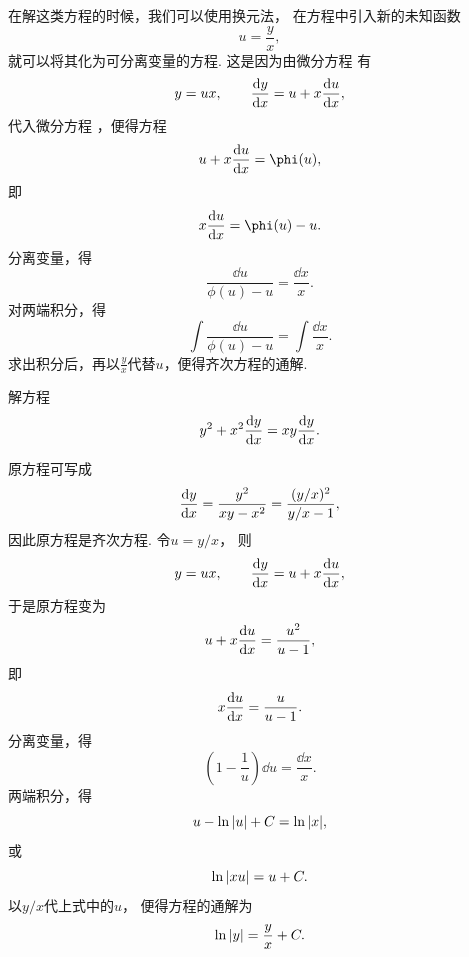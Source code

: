 在解这类方程的时候，我们可以使用换元法，
在方程中引入新的未知函数\begin{equation}\label{equation:微分方程.一阶齐次方程.中间步骤1}
	u=\frac{y}{x},
\end{equation}
就可以将其化为可分离变量的方程.
这是因为由微分方程  有\begin{equation*}
	y = ux,
	\qquad
	\dv{y}{x} = u + x \dv{u}{x},
\end{equation*}
代入微分方程 ，便得方程\begin{equation*}
	u + x \dv{u}{x} = \phi(u),
\end{equation*}
即\begin{equation*}
	x \dv{u}{x} = \phi(u) - u.
\end{equation*}
分离变量，得\begin{equation*}
	\frac{\dd{u}}{\phi(u) - u} = \frac{\dd{x}}{x}.
\end{equation*}
对两端积分，得\begin{equation*}
	\int \frac{\dd{u}}{\phi(u) - u} = \int \frac{\dd{x}}{x}.
\end{equation*}
求出积分后，再以\(\frac{y}{x}\)代替\(u\)，便得齐次方程的通解.

\begin{example}
解方程\begin{equation*}y^2+x^2 \dv{y}{x} = xy \dv{y}{x}.\end{equation*}
\begin{solution}
原方程可写成\begin{equation*}
	\dv{y}{x} = \frac{y^2}{xy-x^2} = \frac{(y/x)^2}{y/x-1},
\end{equation*}
因此原方程是齐次方程.
令\(u=y/x\)，
则\begin{equation*}
	y=ux, \qquad \dv{y}{x} = u + x \dv{u}{x},
\end{equation*}
于是原方程变为\begin{equation*}
	u+x \dv{u}{x} = \frac{u^2}{u-1},
\end{equation*}
即\begin{equation*}
	x \dv{u}{x} = \frac{u}{u-1}.
\end{equation*}
分离变量，得\begin{equation*}
	\left(1-\frac{1}{u}\right) \dd{u} = \frac{\dd{x}}{x}.
\end{equation*}
两端积分，得\begin{equation*}
	u - \ln\abs{u} + C = \ln\abs{x},
\end{equation*}或\begin{equation*}
	\ln\abs{xu} = u + C.
\end{equation*}
以\(y/x\)代上式中的\(u\)，
便得方程的通解为\begin{equation*}
	\ln\abs{y} = \frac{y}{x} + C.
\end{equation*}
\end{solution}
\end{example}


